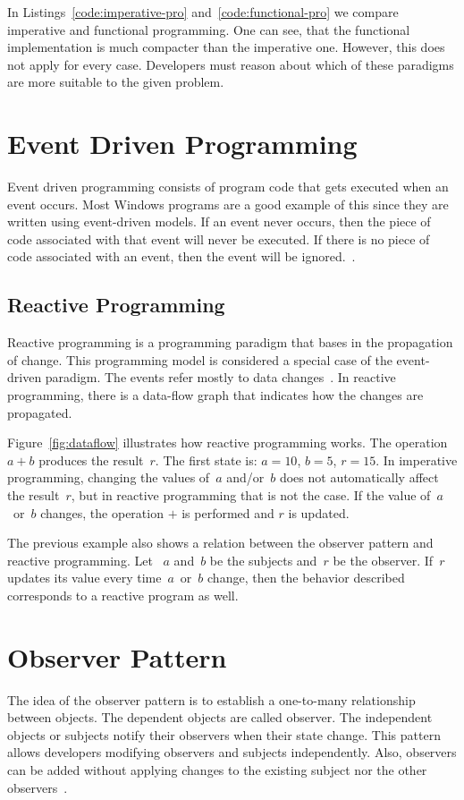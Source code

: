 \documentclass[type=bsc,accentcolor=tud9c]{tudthesis}
\begin{document}
In Listings~\ref{code:imperative-pro} and~\ref{code:functional-pro} we compare imperative and functional programming. One can see, that the functional implementation is much compacter than the imperative one. However, this does not apply for every case. Developers must reason about which of these paradigms are more suitable to the given problem.



\section{Event Driven Programming}
Event driven programming consists of program code that gets executed when an event occurs. Most Windows programs are a good example of this since they are written using event-driven models. If an event never occurs, then the piece of code associated with that event will never be executed. If there is no piece of code associated with an event, then the event will be ignored.~\cite{bookEventDrivenProgramming}.

\subsection{Reactive Programming}
Reactive programming is a programming paradigm that bases in the propagation of change. This programming model is considered a special case of the event-driven paradigm. The events refer mostly to data changes~\cite{bookLearningReactive}. In reactive programming, there is a data-flow graph that indicates how the changes are propagated.
 
Figure~\ref{fig:dataflow} illustrates how reactive programming works. The operation~$a + b$ produces the result~$r$. The first state is: $a=10$, $b=5$, $r=15$. In imperative programming, changing the values of~$a$ and/or~$b$ does not automatically affect the result~$r$, but in reactive programming that is not the case. If the value of~$a$~or~$b$ changes, the operation $+$ is performed and $r$ is updated. 

The previous example also shows a relation between the observer pattern and reactive programming. Let ~$a$ and~$b$ be the subjects and~$r$ be the observer.  If~$r$ updates its value every time~$a$~or~$b$ change, then the behavior described corresponds to a reactive program as well.



\section{Observer Pattern}
The idea of the observer pattern is to establish a one-to-many relationship between objects. The dependent objects are called observer. The independent objects or subjects notify their observers when their state change. This pattern allows developers modifying observers and subjects independently. Also, observers can be added without applying changes to the existing subject nor the other observers~\cite{bookDesignPatterns}.
\end{document}
